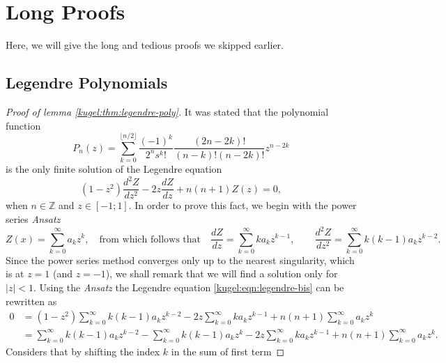 \section{Long Proofs}

Here, we will give the long and tedious proofs we skipped earlier.

\subsection{Legendre Polynomials} \label{kugel:sec:proofs:legendre}

\begin{proof}[Proof of lemma \ref{kugel:thm:legendre-poly}]
  It was stated that the polynomial function
  \begin{equation*}
    P_n(z) = \sum^{\lfloor n/2 \rfloor}_{k=0}
      \frac{(-1)^k}{2^n s^k!} \frac{(2n - 2k)!}{(n - k)! (n-2k)!} z^{n - 2k}
  \end{equation*}
  is the only finite solution of the Legendre equation
  \begin{equation}
    \label{kugel:eqn:legendre-bis}
    (1 - z^2)\frac{d^2 Z}{dz^2}
    - 2z\frac{d Z}{dz}
    + n(n + 1) Z(z) = 0,
  \end{equation}
  when $n \in \mathbb{Z}$ and $z \in [-1; 1]$. In order to prove this fact, we
  begin with the power series \emph{Ansatz}
  \begin{equation*}
    Z(x) = \sum_{k=0}^\infty a_k z^k,
    \quad\text{from which follows that}\quad
    \frac{dZ}{dz} = \sum_{k=0}^\infty k a_k z^{k-1}, \qquad
    \frac{d^2 Z}{dz^2} = \sum_{k=0}^\infty k (k-1) a_k z^{k-2}.
  \end{equation*}
  Since the power series method converges only up to the nearest singularity,
  which is at $z=1$ (and $z=-1$), we shall remark that we will find a solution
  only for $|z|<1$. Using the \emph{Ansatz} the Legendre equation
  \eqref{kugel:eqn:legendre-bis} can be rewritten as
  \begin{align}
    0 &= (1-z^2) \sum_{k=0}^\infty k (k-1) a_k z^{k-2}
      - 2z\sum_{k=0}^\infty k a_k z^{k-1}
      + n(n+1)\sum_{k=0}^\infty a_k z^k \nonumber \\
    &= \sum_{k=0}^\infty k (k-1) a_k z^{k-2}
      - \sum_{k=0}^\infty k (k-1) a_k z^{k}
      - 2z\sum_{k=0}^\infty k a_k z^{k-1}
      + n(n+1)\sum_{k=0}^\infty a_k z^k. \label{kugel:eqn:legendre-ansatz}
  \end{align}
  Considers that by shifting the index $k$ in the sum of first term

\end{proof}
